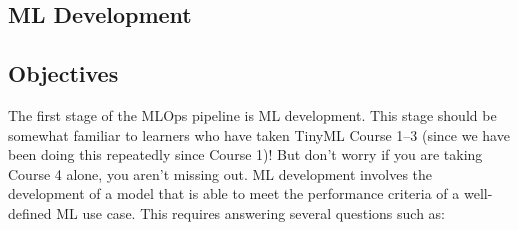 \subsection{ML Development}


\subsection{Objectives}

    The first stage of the MLOps pipeline is ML development. This stage should be somewhat familiar to learners who have taken TinyML Course 1--3 (since we have been doing this repeatedly since Course 1)! But don’t worry if you are taking Course 4 alone, you aren’t missing out. ML development involves the development of a model that is able to meet the performance criteria of a well-defined ML use case. This requires answering several questions such as:
    
